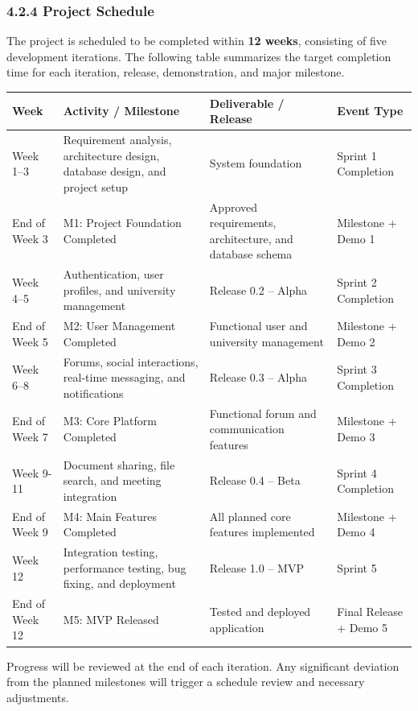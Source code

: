 \documentclass[12pt]{article}
\renewcommand{\baselinestretch}{1.5}
\begin{document}
\subsubsection*{4.2.4 Project Schedule}
\par\medskip
The project is scheduled to be completed within \textbf{12 weeks}, consisting of five development iterations. The following table summarizes the target completion time for each iteration, release, demonstration, and major milestone.
\par\medskip
\begingroup
\scriptsize
\renewcommand{\baselinestretch}{1.0}\selectfont
\renewcommand{\arraystretch}{1.15}
\setlength{\tabcolsep}{4pt}
\begin{longtable}{|>{\raggedright\arraybackslash}p{}|>{\raggedright\arraybackslash}p{}|>{\raggedright\arraybackslash}p{}|>{\raggedright\arraybackslash}p{}|}
\hline
Week & Activity /\allowbreak{} Milestone & Deliverable /\allowbreak{} Release & Event Type \\ \hline
\endhead
Week 1–3 & Requirement analysis, architecture design, database design, and project setup & System foundation & Sprint 1 Completion \\ \hline
End of Week 3 & M1: Project Foundation Completed & Approved requirements, architecture, and database schema & Milestone + Demo 1 \\ \hline
Week 4–5 & Authentication, user profiles, and university management & Release 0.2 – Alpha & Sprint 2 Completion \\ \hline
End of Week 5 & M2: User Management Completed & Functional user and university management & Milestone + Demo 2 \\ \hline
Week 6–8 & Forums, social interactions, real-time messaging, and notifications & Release 0.3 – Alpha & Sprint 3 Completion \\ \hline
End of Week 7 & M3: Core Platform Completed & Functional forum and communication features & Milestone + Demo 3 \\ \hline
Week 9-11 & Document sharing, file search, and meeting integration & Release 0.4 – Beta & Sprint 4 Completion \\ \hline
End of Week 9 & M4: Main Features Completed & All planned core features implemented & Milestone + Demo 4 \\ \hline
Week 12 & Integration testing, performance testing, bug fixing, and deployment & Release 1.0 – MVP & Sprint 5 \\ \hline
End of Week 12 & M5: MVP Released & Tested and deployed application & Final Release + Demo 5 \\ \hline
\end{longtable}
\endgroup
\par\medskip
Progress will be reviewed at the end of each iteration. Any significant deviation from the planned milestones will trigger a schedule review and necessary adjustments.
\par\medskip
\hypertarget{sec:425-project-resourcing}{}
\end{document}
